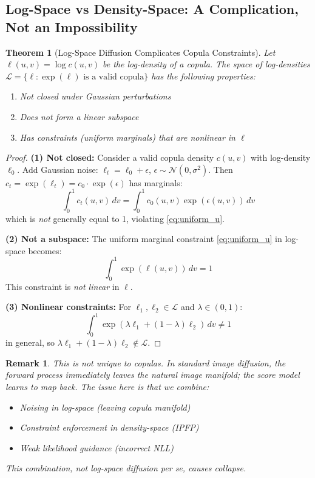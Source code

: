 \documentclass[11pt]{article}
\newtheorem{theorem}{Theorem}
\newtheorem{remark}{Remark}
\begin{document}
\subsection{Log-Space vs Density-Space: A Complication, Not an Impossibility}

\begin{theorem}[Log-Space Diffusion Complicates Copula Constraints]
Let $\ell(u,v) = \log c(u,v)$ be the log-density of a copula. The space of log-densities $\mathcal{L} = \{\ell : \exp(\ell) \text{ is a valid copula}\}$ has the following properties:
\begin{enumerate}
    \item Not closed under Gaussian perturbations
    \item Does not form a linear subspace
    \item Has constraints (uniform marginals) that are \emph{nonlinear} in $\ell$
\end{enumerate}
\end{theorem}

\begin{proof}
\textbf{(1) Not closed:} Consider a valid copula density $c(u,v)$ with log-density $\ell_0$. Add Gaussian noise: $\ell_t = \ell_0 + \epsilon$, $\epsilon \sim \mathcal{N}(0, \sigma^2)$. Then $c_t = \exp(\ell_t) = c_0 \cdot \exp(\epsilon)$ has marginals:
\begin{equation}
\int_0^1 c_t(u,v) \, dv = \int_0^1 c_0(u,v) \exp(\epsilon(u,v)) \, dv
\end{equation}
which is \emph{not} generally equal to 1, violating \eqref{eq:uniform_u}.

\textbf{(2) Not a subspace:} The uniform marginal constraint \eqref{eq:uniform_u} in log-space becomes:
\begin{equation}
\int_0^1 \exp(\ell(u,v)) \, dv = 1
\end{equation}
This constraint is \emph{not linear} in $\ell$.

\textbf{(3) Nonlinear constraints:} For $\ell_1, \ell_2 \in \mathcal{L}$ and $\lambda \in (0,1)$:
\begin{equation}
\int_0^1 \exp(\lambda \ell_1 + (1-\lambda) \ell_2) \, dv \neq 1
\end{equation}
in general, so $\lambda \ell_1 + (1-\lambda) \ell_2 \notin \mathcal{L}$.
\end{proof}

\begin{remark}
This is \emph{not unique to copulas}. In standard image diffusion, the forward process immediately leaves the natural image manifold; the score model learns to map back. The issue here is that we combine:
\begin{itemize}
    \item Noising in log-space (leaving copula manifold)
    \item Constraint enforcement in density-space (IPFP)
    \item Weak likelihood guidance (incorrect NLL)
\end{itemize}
This combination, not log-space diffusion per se, causes collapse.
\end{remark}
\end{document}
